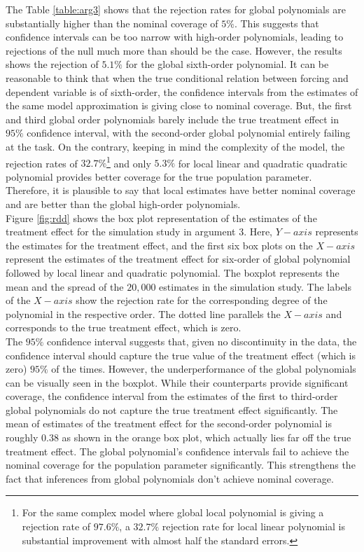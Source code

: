 \documentclass[fleqn]{article}
\begin{document}
    The Table \ref{table:arg3} shows that the rejection rates for global polynomials are substantially higher than the nominal coverage of $5\%$. This suggests that confidence intervals can be too narrow with high-order polynomials, leading to rejections of the null much more than should be the case. However, the results shows the rejection of $5.1\%$ for the global sixth-order polynomial. It can be reasonable to think that when the true conditional relation between forcing and dependent variable is of sixth-order, the confidence intervals from the estimates of the same model approximation is giving close to nominal coverage. But, the first and third global order polynomials barely include the true treatment effect in $95\%$ confidence interval, with the second-order global polynomial entirely failing at the task. On the contrary, keeping in mind the complexity of the model, the rejection rates of $32.7\%$\footnote{For the same complex model where global local polynomial is giving a rejection rate of $97.6\%$, a $32.7\%$ rejection rate for local linear polynomial is substantial improvement with almost half the standard errors.} and only $5.3\%$ for local linear and quadratic quadratic polynomial provides better coverage for the true population parameter. Therefore, it is plausible to say that local estimates have better nominal coverage and are better than the global high-order polynomials. \\

    Figure \ref{fig:rdd} shows the box plot representation of the estimates of the treatment effect for the simulation study in argument 3. Here, $Y−axis$ represents the estimates for the treatment effect, and the first six box plots on the $X-axis$ represent the estimates of the treatment effect for six-order of global polynomial followed by local linear and quadratic polynomial. The boxplot represents the mean and the spread of the $20,000$ estimates in the simulation study. The labels of the $X−axis$ show the rejection rate for the corresponding degree of the polynomial in the respective order. The dotted line parallels the $X-axis$ and corresponds to the true treatment effect, which is zero. \\
    
    The $95\%$ confidence interval suggests that, given no discontinuity in the data, the confidence interval should capture the true value of the treatment effect (which is zero) $95\%$ of the times. However, the underperformance of the global polynomials can be visually seen in the boxplot. While their counterparts provide significant coverage, the confidence interval from the estimates of the first to third-order global polynomials do not capture the true treatment effect significantly. The mean of estimates of the treatment effect for the second-order polynomial is roughly $0.38$ as shown in the orange box plot, which actually lies far off the true treatment effect. The global polynomial’s confidence intervals fail to achieve the nominal coverage for the population parameter significantly. This strengthens the fact that inferences from global polynomials don't achieve nominal coverage. \\
\end{document}
